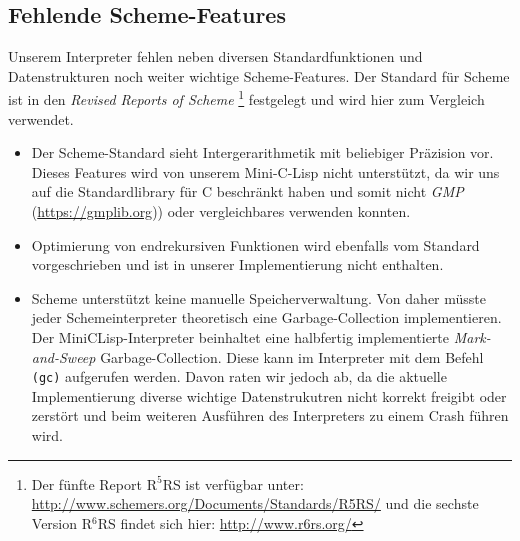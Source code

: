 \subsection[Features]{Fehlende Scheme-Features}
Unserem Interpreter fehlen neben diversen Standardfunktionen und
Datenstrukturen noch weiter wichtige Scheme-Features. Der Standard für Scheme
ist in den \emph{Revised Reports of Scheme}
\footnote{Der fünfte Report $\text{R}^5$RS ist verfügbar unter:
\url{http://www.schemers.org/Documents/Standards/R5RS/} und die sechste Version
R$^6$RS findet sich hier: \url{http://www.r6rs.org/}}
festgelegt und wird hier zum Vergleich verwendet.
\begin{itemize}
  \item Der Scheme-Standard sieht Intergerarithmetik mit beliebiger Präzision
    vor. Dieses Features wird von unserem Mini-C-Lisp nicht unterstützt, da
    wir uns auf die Standardlibrary für C beschränkt haben und somit nicht
    \emph{GMP} (\url{https://gmplib.org})) oder vergleichbares verwenden
    konnten.
  \item Optimierung von endrekursiven Funktionen wird ebenfalls vom Standard
    vorgeschrieben und ist in unserer Implementierung nicht enthalten.
  \item Scheme unterstützt keine manuelle Speicherverwaltung. Von daher
    müsste jeder Schemeinterpreter theoretisch eine Garbage-Collection
    implementieren. Der MiniCLisp-Interpreter beinhaltet eine halbfertig
    implementierte \emph{Mark-and-Sweep} Garbage-Collection. Diese kann
    im Interpreter mit dem Befehl \texttt{(gc)} aufgerufen werden. Davon
    raten wir jedoch ab, da die aktuelle Implementierung diverse wichtige
    Datenstrukutren nicht korrekt freigibt oder zerstört und beim weiteren
    Ausführen des Interpreters zu einem Crash führen wird.
\end{itemize}

